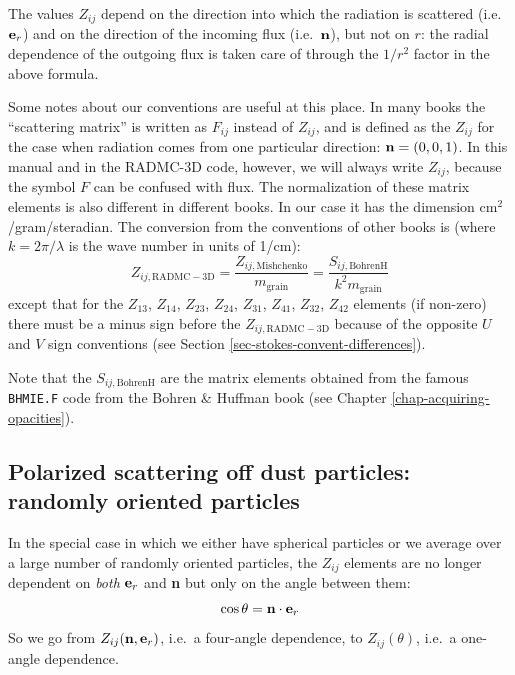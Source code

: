 \documentclass{report}
\begin{document}
The values $Z_{ij}$ depend on the direction into which the radiation is
scattered (i.e.\ ${\bf e}_r$) and on the direction of the incoming flux
(i.e.\ ${\bf n}$), but not on $r$: the radial dependence of the outgoing
flux is taken care of through the $1/r^2$ factor in the above formula.

Some notes about our conventions are useful at this place. In many books the
``scattering matrix'' is written as $F_{ij}$ instead of $Z_{ij}$, and is
defined as the $Z_{ij}$ for the case when radiation comes from one
particular direction: ${\bf n}=(0,0,1)$. In this manual and in the RADMC-3D
code, however, we will always write $Z_{ij}$, because the symbol $F$ can be
confused with flux. The normalization of these matrix elements is also
different in different books. In our case it has the dimension
cm$^2$/gram/steradian. The conversion from the conventions of other books is
(where $k=2\pi/\lambda$ is the wave number in units of 1/cm):
\begin{equation}
Z_{ij,\mathrm{RADMC-3D}} = \frac{Z_{ij,\mathrm{Mishchenko}}}{m_{\mathrm{grain}}}
= \frac{S_{ij,\mathrm{BohrenH}}}{k^2m_{\mathrm{grain}}}
\end{equation}
except that for the $Z_{13}$, $Z_{14}$, $Z_{23}$, $Z_{24}$, $Z_{31}$,
$Z_{41}$, $Z_{32}$, $Z_{42}$ elements (if non-zero) there must be a minus
sign before the $Z_{ij,\mathrm{RADMC-3D}}$ because of the opposite $U$ and
$V$ sign conventions (see Section \ref{sec-stokes-convent-differences}).

Note that the $S_{ij,\mathrm{BohrenH}}$ are the matrix elements obtained
from the famous {\small\tt BHMIE.F} code from the Bohren \& Huffman book
(see Chapter \ref{chap-acquiring-opacities}). 

\subsection{Polarized scattering off dust particles: randomly oriented particles}
In the special case in which we either have spherical particles or we
average over a large number of randomly oriented particles, the $Z_{ij}$
elements are no longer dependent on {\em both} ${\bf e}_r$ and {\bf n} but
only on the angle between them:
\begin{equation}
\cos\theta = {\bf n}\cdot{\bf e}_r
\end{equation}
So we go from $Z_{ij}({\bf n},{\bf e}_r)$, i.e.\ a four-angle dependence, to
$Z_{ij}(\theta)$, i.e.\ a one-angle dependence. 
\end{document}
